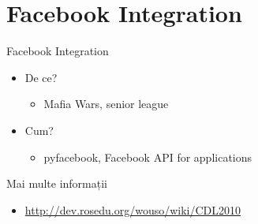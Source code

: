 \documentclass{beamer}
\begin{document}
\section{Facebook Integration}

\begin{frame}{Facebook Integration}
  \begin{itemize}
   \item De ce? 
   \pause
   \begin{itemize}
   \item Mafia Wars, senior league
   \end{itemize}
   \pause 
   \item Cum?
   \pause
   \begin{itemize}
   \item pyfacebook, Facebook API for applications
   \end{itemize}
  \end{itemize}
\end{frame}

\begin{frame}{Mai multe informații}
	\begin{itemize}
	\item \url{http://dev.rosedu.org/wouso/wiki/CDL2010}
	\end{itemize}
\end{frame}
\end{document}

